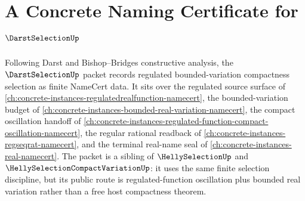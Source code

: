 \chapter{A Concrete Naming Certificate for $\DarstSelectionUp$}
\label{ch:concrete-instances-darst-selection-namecert}

Following Darst and Bishop--Bridges constructive analysis, the $\DarstSelectionUp$ packet records regulated bounded-variation compactness selection as finite NameCert data. It sits over the regulated source surface of \autoref{ch:concrete-instances-regulatedrealfunction-namecert}, the bounded-variation budget of \autoref{ch:concrete-instances-bounded-real-variation-namecert}, the compact oscillation handoff of \autoref{ch:concrete-instances-regulated-function-compact-oscillation-namecert}, the regular rational readback of \autoref{ch:concrete-instances-regseqrat-namecert}, and the terminal real-name seal of \autoref{ch:concrete-instances-real-namecert}. The packet is a sibling of $\HellySelectionUp$ and $\HellySelectionCompactVariationUp$: it uses the same finite selection discipline, but its public route is regulated-function oscillation plus bounded real variation rather than a free host compactness theorem.

